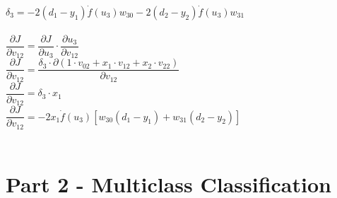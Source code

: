 \documentclass[a4paper]{article}    %
\begin{document}
$ \delta_3 = - 2(d_1-y_1)\dot{f}(u_3)w_{30} - 2(d_2-y_2)\dot{f}(u_3)w_{31} $\\
\vspace{0.1mm}\\
$ \dfrac{\partial J}{\partial v_{12}} = \dfrac{\partial J}{\partial u_3} \cdot \dfrac{\partial u_3}{\partial v_{12}} $\\
$ \dfrac{\partial J}{\partial v_{12}} = \dfrac{\delta_3 \cdot \partial(1 \cdot v_{02} + x_1 \cdot v_{12} + x_2 \cdot v_{22})}{\partial v_{12}} $\\
$ \dfrac{\partial J}{\partial v_{12}} = \delta_3 \cdot x_1 $\\
$ \dfrac{\partial J}{\partial v_{12}} = -2x_1\dot{f}(u_3)[w_{30}(d_1-y_1) + w_{31}(d_2-y_2)] $\\
\vspace{0.1mm}\\

\section{Part 2 - Multiclass Classification}

\end{document}
